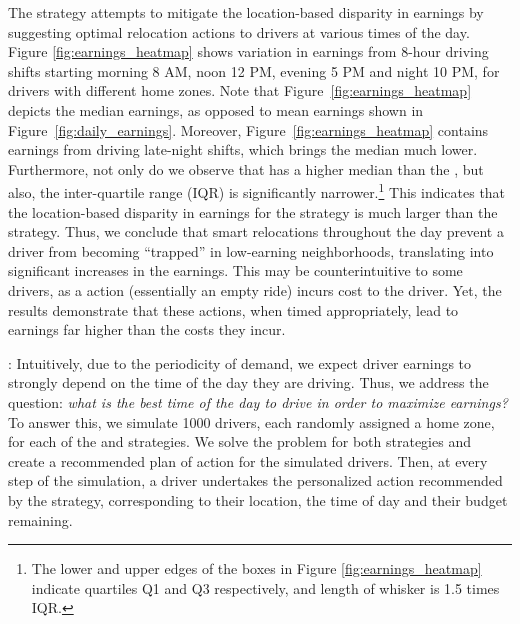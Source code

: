 The {\relocation} strategy attempts to mitigate the location-based disparity in earnings by suggesting optimal relocation actions to drivers at various times of the day. Figure \ref{fig:earnings_heatmap} shows variation in earnings from 8-hour driving shifts starting morning 8 AM, noon 12 PM, evening 5 PM and night 10 PM, for drivers with different home zones.
Note that Figure~\ref{fig:earnings_heatmap} depicts the median earnings, as opposed to mean earnings shown in Figure~\ref{fig:daily_earnings}. Moreover, Figure~\ref{fig:earnings_heatmap} contains earnings from driving late-night shifts, which brings the median much lower.
Furthermore, not only do we observe that  {\relocation} has a higher median than the {\naive}, but also, the inter-quartile range (IQR) is significantly narrower.\footnote{The lower and upper edges of the boxes in Figure \ref{fig:earnings_heatmap} indicate quartiles Q1 and Q3 respectively, and length of whisker is 1.5 times IQR.} This indicates that the location-based disparity in earnings for the {\naive} strategy is much larger than the {\relocation} strategy. Thus, we conclude that smart relocations throughout the day prevent a driver from becoming ``trapped'' in low-earning neighborhoods, translating 
into significant increases in the earnings. 
This may be counterintuitive to some drivers, as a {\relocate} action (essentially an empty ride) 
incurs cost to the driver. Yet, the results demonstrate that these actions, when timed appropriately, 
lead to earnings far higher than the costs they incur.

: Intuitively, due to the periodicity of demand, we expect driver earnings to strongly depend on the time of the day they are driving. 
Thus, we address the question: \textit{what is the best time of the day to drive in order to maximize earnings?} To answer this, we simulate 1000 drivers, each randomly assigned a home zone, for each of the {\flexible} and {\relocationflexible} strategies. 
We solve the {\originalproblem} problem for both strategies and create a recommended plan of action for the simulated drivers. 
Then, at every step of the simulation, a driver undertakes the personalized action recommended by the strategy, corresponding to
  their location, the time of day and their budget remaining.


